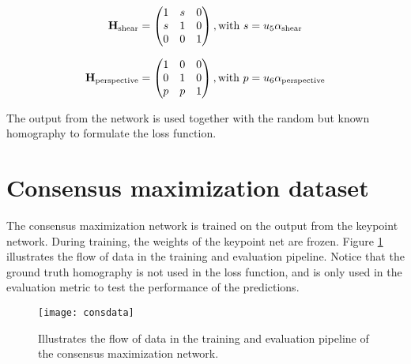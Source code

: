 \begin{equation}
\textbf{H}_{\mathrm{shear}} = 
\begin{pmatrix}
1 & s & 0 \\
s & 1 & 0 \\
0 & 0 & 1 \\
\end{pmatrix}
, \text{with}
\ s=u_5 \alpha_{\mathrm{shear}} \\
\end{equation}

\begin{equation}
\textbf{H}_{\mathrm{perspective}} = 
\begin{pmatrix}
1 & 0 & 0 \\
0 & 1 & 0 \\
p & p & 1 \\
\end{pmatrix}
, \text{with}
\ p=u_6\alpha_{\mathrm{perspective}} \\
\end{equation}

The output from the network is used together with the random but known homography to formulate the loss function.

\section{Consensus maximization dataset}

The consensus maximization network is trained on the output from the keypoint network. During training, the weights of the keypoint net are frozen. Figure \ref{fig:consdata} illustrates the flow of data in the training and evaluation pipeline. Notice that the ground truth homography is not used in the loss function, and is only used in the evaluation metric to test the performance of the predictions.

\begin{figure}[H]
	\centering
	\texttt{[image: consdata]}
	\caption{Illustrates the flow of data in the training and evaluation pipeline of the consensus maximization network.}
	\label{fig:consdata}
\end{figure}
